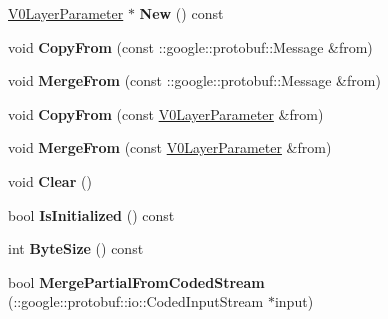 \begin{DoxyCompactItemize}
\mbox{\hyperlink{classcaffe_1_1_v0_layer_parameter}{V0\+Layer\+Parameter}} $\ast$ {\bfseries New} () const
\item 
\mbox{\label{classcaffe_1_1_v0_layer_parameter_adf83cf0a36741cad90acc6f7636ad03c}} 
void {\bfseries Copy\+From} (const \+::google\+::protobuf\+::\+Message \&from)
\item 
\mbox{\label{classcaffe_1_1_v0_layer_parameter_a340450f22fda635630dafcaff975446a}} 
void {\bfseries Merge\+From} (const \+::google\+::protobuf\+::\+Message \&from)
\item 
\mbox{\label{classcaffe_1_1_v0_layer_parameter_ad56ed9ca69b0f22ceec526352adfeea4}} 
void {\bfseries Copy\+From} (const \mbox{\hyperlink{classcaffe_1_1_v0_layer_parameter}{V0\+Layer\+Parameter}} \&from)
\item 
\mbox{\label{classcaffe_1_1_v0_layer_parameter_a256d870d86dd5cd7439b8d57c7475915}} 
void {\bfseries Merge\+From} (const \mbox{\hyperlink{classcaffe_1_1_v0_layer_parameter}{V0\+Layer\+Parameter}} \&from)
\item 
\mbox{\label{classcaffe_1_1_v0_layer_parameter_ac2b081c150b290a017a55879ecd0c51c}} 
void {\bfseries Clear} ()
\item 
\mbox{\label{classcaffe_1_1_v0_layer_parameter_ad0da61073143b1360c0e966682eb7d4b}} 
bool {\bfseries Is\+Initialized} () const
\item 
\mbox{\label{classcaffe_1_1_v0_layer_parameter_acb90a5ae7b179924e0208e199a7dc4c2}} 
int {\bfseries Byte\+Size} () const
\item 
\mbox{\label{classcaffe_1_1_v0_layer_parameter_aa4c25d014f9d2087b5be6238fed39446}} 
bool {\bfseries Merge\+Partial\+From\+Coded\+Stream} (\+::google\+::protobuf\+::io\+::\+Coded\+Input\+Stream $\ast$input)
\item 
\mbox{\label{classcaffe_1_1_v0_layer_parameter_aca7b959b29351751679410410a495353}} 

\end{DoxyCompactItemize}
